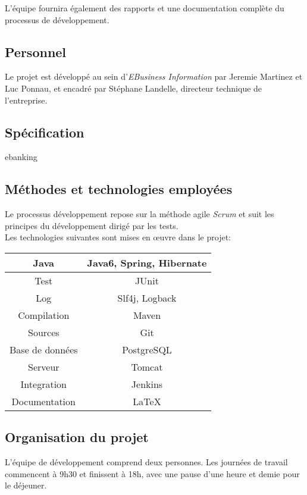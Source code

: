 \documentclass[11pt]{article}
\begin{document}
L'équipe fournira également des rapports et une documentation complète du
processus de développement.

\subsection{Personnel}

Le projet est développé au sein d'\emph{EBusiness Information} par
Jeremie Martinez et Luc Ponnau, et encadré par Stéphane Landelle, directeur
technique de l'entreprise. 

\subsection{Spécification}

ebanking

\subsection{Méthodes et technologies employées}

Le processus développement repose sur la méthode agile \emph{Scrum} et suit les
principes du développement dirigé par les tests.\\

Les technologies suivantes sont mises en \oe{}uvre dans le projet:

\begin{center}
\begin{tabular}{ | c | c | }
\hline Java & Java6, Spring, Hibernate \\
\hline Test & JUnit \\
\hline Log & Slf4j, Logback \\
\hline Compilation & Maven \\
\hline Sources & Git \\
\hline Base de données & PostgreSQL \\
\hline Serveur & Tomcat \\
\hline Integration & Jenkins \\
\hline Documentation & \LaTeX \\ \hline
\end{tabular}
\end{center}

\subsection{Organisation du projet}

L'équipe de développement comprend deux personnes. Les journées de travail
commencent à 9h30 et finissent à 18h, avec une pause d'une heure et demie
pour le déjeuner.\\
\end{document}
